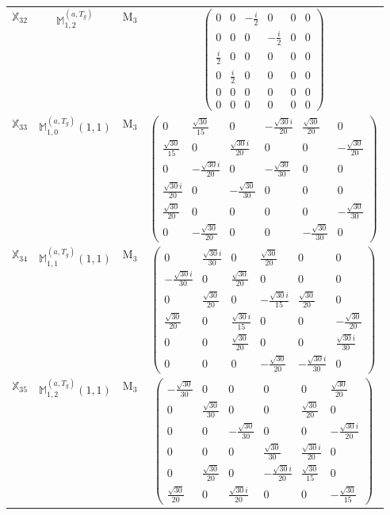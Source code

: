 \documentclass[fleqn,10pt,landscape]{article}
\begin{document}
\begin{itemize}
\begin{center}
\begin{longtable}{c|c|c|c}
$ \mathbb{X}_{32} $ & $\mathbb{M}_{1,2}^{(a,T_{g})}$ & M$_{3}$ & $\begin{pmatrix} 0 & 0 & - \frac{i}{2} & 0 & 0 & 0 \\ 0 & 0 & 0 & - \frac{i}{2} & 0 & 0 \\ \frac{i}{2} & 0 & 0 & 0 & 0 & 0 \\ 0 & \frac{i}{2} & 0 & 0 & 0 & 0 \\ 0 & 0 & 0 & 0 & 0 & 0 \\ 0 & 0 & 0 & 0 & 0 & 0 \end{pmatrix}$ \\
$ \mathbb{X}_{33} $ & $\mathbb{M}_{1,0}^{(a,T_{g})}(1,1)$ & M$_{3}$ & $\begin{pmatrix} 0 & \frac{\sqrt{30}}{15} & 0 & - \frac{\sqrt{30} i}{20} & \frac{\sqrt{30}}{20} & 0 \\ \frac{\sqrt{30}}{15} & 0 & \frac{\sqrt{30} i}{20} & 0 & 0 & - \frac{\sqrt{30}}{20} \\ 0 & - \frac{\sqrt{30} i}{20} & 0 & - \frac{\sqrt{30}}{30} & 0 & 0 \\ \frac{\sqrt{30} i}{20} & 0 & - \frac{\sqrt{30}}{30} & 0 & 0 & 0 \\ \frac{\sqrt{30}}{20} & 0 & 0 & 0 & 0 & - \frac{\sqrt{30}}{30} \\ 0 & - \frac{\sqrt{30}}{20} & 0 & 0 & - \frac{\sqrt{30}}{30} & 0 \end{pmatrix}$ \\
$ \mathbb{X}_{34} $ & $\mathbb{M}_{1,1}^{(a,T_{g})}(1,1)$ & M$_{3}$ & $\begin{pmatrix} 0 & \frac{\sqrt{30} i}{30} & 0 & \frac{\sqrt{30}}{20} & 0 & 0 \\ - \frac{\sqrt{30} i}{30} & 0 & \frac{\sqrt{30}}{20} & 0 & 0 & 0 \\ 0 & \frac{\sqrt{30}}{20} & 0 & - \frac{\sqrt{30} i}{15} & \frac{\sqrt{30}}{20} & 0 \\ \frac{\sqrt{30}}{20} & 0 & \frac{\sqrt{30} i}{15} & 0 & 0 & - \frac{\sqrt{30}}{20} \\ 0 & 0 & \frac{\sqrt{30}}{20} & 0 & 0 & \frac{\sqrt{30} i}{30} \\ 0 & 0 & 0 & - \frac{\sqrt{30}}{20} & - \frac{\sqrt{30} i}{30} & 0 \end{pmatrix}$ \\
$ \mathbb{X}_{35} $ & $\mathbb{M}_{1,2}^{(a,T_{g})}(1,1)$ & M$_{3}$ & $\begin{pmatrix} - \frac{\sqrt{30}}{30} & 0 & 0 & 0 & 0 & \frac{\sqrt{30}}{20} \\ 0 & \frac{\sqrt{30}}{30} & 0 & 0 & \frac{\sqrt{30}}{20} & 0 \\ 0 & 0 & - \frac{\sqrt{30}}{30} & 0 & 0 & - \frac{\sqrt{30} i}{20} \\ 0 & 0 & 0 & \frac{\sqrt{30}}{30} & \frac{\sqrt{30} i}{20} & 0 \\ 0 & \frac{\sqrt{30}}{20} & 0 & - \frac{\sqrt{30} i}{20} & \frac{\sqrt{30}}{15} & 0 \\ \frac{\sqrt{30}}{20} & 0 & \frac{\sqrt{30} i}{20} & 0 & 0 & - \frac{\sqrt{30}}{15} \end{pmatrix}$ \\

\end{longtable}
\end{center}
\end{itemize}
\end{document}
